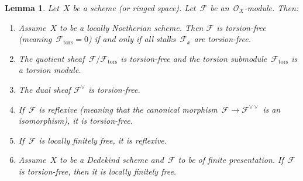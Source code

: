\documentclass[10pt]{amsart}
\theoremstyle{definition}
\theoremstyle{plain}
\newtheorem{lemma}[defn]{Lemma}
\theoremstyle{remark}
\newcommand{\F}{\mathcal{F}}
\renewcommand{\O}{\mathcal{O}}
\newcommand{\tors}{\mathrm{tors}}
\newcommand{\?}{\,{:}\,}
\renewcommand{\_}{\mathpunct{.}\,}
\begin{document}
\begin{lemma}\label{lemma:torsion-stuff}
Let~$X$ be a scheme (or ringed space). Let~$\F$ be
an~$\O_X$-module. Then:
\begin{enumerate}
\item Assume~$X$ to be a locally Noetherian scheme. Then $\F$ is torsion-free
(meaning~$\F_\tors = 0$) if and only if all stalks~$\F_x$ are torsion-free.
\item The quotient sheaf~$\F/\F_\tors$ is torsion-free and the torsion
submodule~$\F_\tors$ is a torsion module.
\item The dual sheaf $\F^\vee$ is torsion-free.
\item If~$\F$ is reflexive (meaning that the canonical morphism~$\F \to
\F^{\vee\vee}$ is an isomorphism), it is torsion-free.
\item If~$\F$ is locally finitely free, it is reflexive.
\item Assume~$X$ to be a Dedekind scheme and~$\F$ to be of finite presentation.
If~$\F$ is torsion-free, then it is locally finitely free.
\end{enumerate}
\end{lemma}
\end{document}
